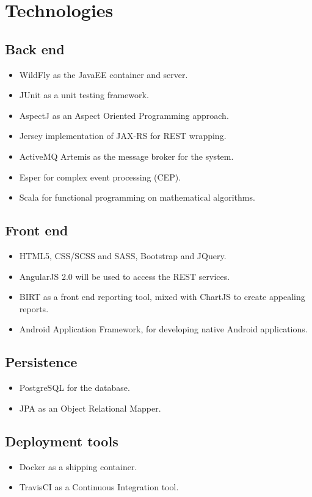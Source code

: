 \documentclass[11pt,a4paper]{article}
\begin{document}
\pagebreak
	
\section{Technologies}
\subsection{Back end}
\begin{itemize}
	\item WildFly as the JavaEE container and server.
	\item JUnit as a unit testing framework.
	\item AspectJ as an Aspect Oriented Programming approach.
	\item Jersey implementation of JAX-RS for REST wrapping.
	\item ActiveMQ Artemis as the message broker for the system.
	\item Esper for complex event processing (CEP).
	\item Scala for functional programming on mathematical algorithms.
\end{itemize}
\subsection{Front end}
\begin{itemize}
	\item HTML5, CSS/SCSS and SASS, Bootstrap and JQuery.
	\item AngularJS 2.0 will be used to access the REST services.
	\item BIRT as a front end reporting tool, mixed with ChartJS to create appealing reports.
	\item Android Application Framework, for developing native Android applications.
\end{itemize}
\subsection{Persistence}
\begin{itemize}
	\item PostgreSQL for the database.
	\item JPA as an Object Relational Mapper.
\end{itemize}
\subsection{Deployment tools}
\begin{itemize}
	\item Docker as a shipping container.
	\item TravisCI as a Continuous Integration tool.
\end{itemize}
\end{document}
